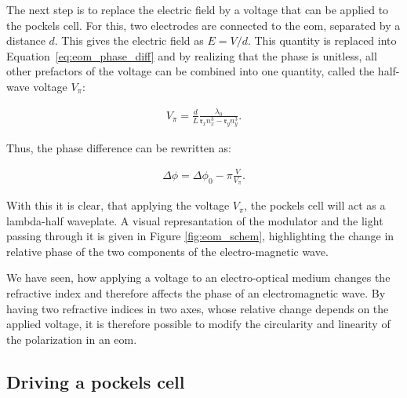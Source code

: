 \begin{figure}[t]
\end{figure}

The next step is to replace the electric field by a voltage that can be applied to the pockels cell. For this, two electrodes are connected to the \ac{eom}, separated by a distance $d$. This gives the electric field as $E=V/d$. This quantity is replaced into Equation~\ref{eq:eom_phase_diff} and by realizing that the phase is unitless, all other prefactors of the voltage can be combined into one quantity, called the half-wave voltage $V_\pi$:

\begin{align}
	V_\pi = \frac{d}{L} \frac{\lambda_0}{\mathfrak{r}_x n_x^3 - \mathfrak{r}_y n_y^3}.
\end{align}

Thus, the phase difference can be rewritten as:

\begin{align}
	\label{eq:eom_phase_diff}
	\Delta \phi = \Delta \phi_0 - \pi \frac{V}{V_\pi} .
\end{align}

With this it is clear, that applying the voltage $V_\pi$, the pockels cell will act as a lambda-half waveplate. A visual represantation of the modulator and the light passing through it is given in Figure \ref{fig:eom_schem}, highlighting the change in relative phase of the two components of the electro-magnetic wave.

We have seen, how applying a voltage to an electro-optical medium changes the refractive index and therefore affects the phase of an electromagnetic wave. By having two refractive indices in two axes, whose relative change depends on the applied voltage, it is therefore possible to modify the circularity and linearity of the polarization in an \acl{eom}.

\subsection{Driving a pockels cell}

